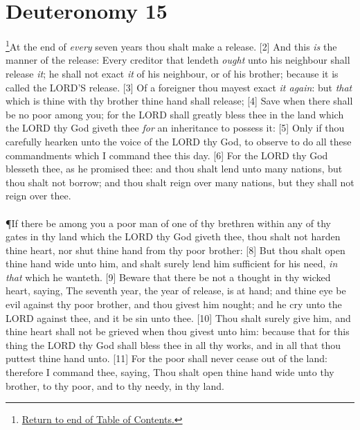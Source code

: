 \chapter{Deuteronomy 15}
\footnote{\textcolor[rgb]{0.00,0.25,0.00}{\hyperlink{DeuteronomyTOC}{Return to end of Table of Contents.}}}\textcolor[rgb]{0.00,0.00,1.00}{At the end of \emph{every} seven years thou shalt make a release.}
[2] \textcolor[rgb]{0.00,0.00,1.00}{And this \emph{is} the manner of the release: Every creditor that lendeth \emph{ought} unto his neighbour shall release \emph{it}; he shall not exact \emph{it} of his neighbour, or of his brother; because it is called the LORD'S release.}
[3] \textcolor[rgb]{0.00,0.00,1.00}{Of a foreigner thou mayest exact \emph{it again}: but \emph{that} which is thine with thy brother thine hand shall release;}
[4] \textcolor[rgb]{0.00,0.00,1.00}{Save when there shall be no poor among you; for the LORD shall greatly bless thee in the land which the LORD thy God giveth thee \emph{for} an inheritance to possess it:}
[5] \textcolor[rgb]{0.00,0.00,1.00}{Only if thou carefully hearken unto the voice of the LORD thy God, to observe to do all these commandments which I command thee this day.}
[6] \textcolor[rgb]{0.00,0.00,1.00}{For the LORD thy God blesseth thee, as he promised thee: and thou shalt lend unto many nations, but thou shalt not borrow; and thou shalt reign over many nations, but they shall not reign over thee.}\\
\\
\P \textcolor[rgb]{0.00,0.00,1.00}{If there be among you a poor man of one of thy brethren within any of thy gates in thy land which the LORD thy God giveth thee, thou shalt not harden thine heart, nor shut thine hand from thy poor brother:}
[8] \textcolor[rgb]{0.00,0.00,1.00}{But thou shalt open thine hand wide unto him, and shalt surely lend him sufficient for his need, \emph{in that} which he wanteth.}
[9] \textcolor[rgb]{0.00,0.00,1.00}{Beware that there be not a thought in thy wicked heart, saying, The seventh year, the year of release, is at hand; and thine eye be evil against thy poor brother, and thou givest him nought; and he cry unto the LORD against thee, and it be sin unto thee.}
[10] \textcolor[rgb]{0.00,0.00,1.00}{Thou shalt surely give him, and thine heart shall not be grieved when thou givest unto him: because that for this thing the LORD thy God shall bless thee in all thy works, and in all that thou puttest thine hand unto.}
[11] \textcolor[rgb]{0.00,0.00,1.00}{For the poor shall never cease out of the land: therefore I command thee, saying, Thou shalt open thine hand wide unto thy brother, to thy poor, and to thy needy, in thy land.}\\
